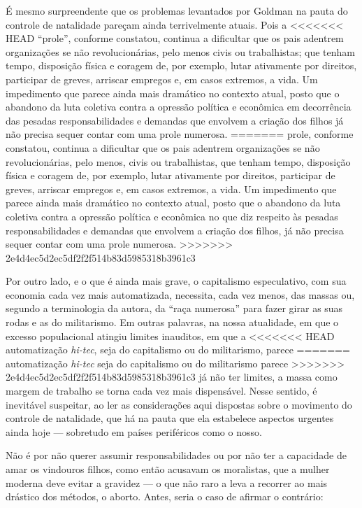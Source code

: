 É mesmo surpreendente que os problemas levantados por Goldman na pauta
do controle de natalidade pareçam ainda terrivelmente atuais. Pois a
<<<<<<< HEAD
``prole'', conforme constatou, continua a dificultar que os pais
adentrem organizações se não revolucionárias, pelo menos civis ou
trabalhistas; que tenham tempo, disposição física e coragem de, por
exemplo, lutar ativamente por direitos, participar de greves, arriscar
empregos e, em casos extremos, a vida. Um impedimento que parece ainda
mais dramático no contexto atual, posto que o abandono da luta coletiva
contra a opressão política e econômica em decorrência das pesadas
responsabilidades e demandas que envolvem a criação dos filhos já não
precisa sequer contar com uma prole numerosa.
=======
prole, conforme constatou, continua a dificultar que os pais
adentrem organizações se não revolucionárias, pelo menos, civis ou
trabalhistas, que tenham tempo, disposição física e coragem de, por
exemplo, lutar ativamente por direitos, participar de greves, arriscar
empregos e, em casos extremos, a vida. Um impedimento que parece ainda
mais dramático no contexto atual, posto que o abandono da luta coletiva
contra a opressão política e econômica no que diz respeito às pesadas
responsabilidades e demandas que envolvem a criação dos filhos, já não
precisa sequer contar com uma prole numerosa. 
>>>>>>> 2e4d4ec5d2ec5df2f2f514b83d5985318b3961c3

Por outro lado, e o que é
ainda mais grave, o capitalismo especulativo, com sua economia cada vez
mais automatizada, necessita, cada vez menos, das massas ou, segundo a
terminologia da autora, da ``raça numerosa'' para fazer girar as suas
rodas e as do militarismo. Em outras palavras, na nossa atualidade, em
que o excesso populacional atingiu limites inauditos, em que a
<<<<<<< HEAD
automatização \emph{hi-tec}, seja do capitalismo ou do militarismo, parece
=======
automatização \textit{hi-tec} seja do capitalismo ou do militarismo parece
>>>>>>> 2e4d4ec5d2ec5df2f2f514b83d5985318b3961c3
já não ter limites, a massa como margem de trabalho se torna cada vez
mais dispensável. Nesse sentido, é inevitável suspeitar, ao ler as
considerações aqui dispostas sobre o movimento do controle de
natalidade, que há na pauta que ela estabelece aspectos urgentes ainda
hoje --- sobretudo em países periféricos como o nosso. 

Não é por não
querer assumir responsabilidades ou por não ter a capacidade de amar os
vindouros filhos, como então acusavam os moralistas, que a mulher
moderna deve evitar a gravidez --- o que não raro a leva a
recorrer ao mais drástico dos métodos, o aborto. Antes, seria o caso de
afirmar o contrário:

